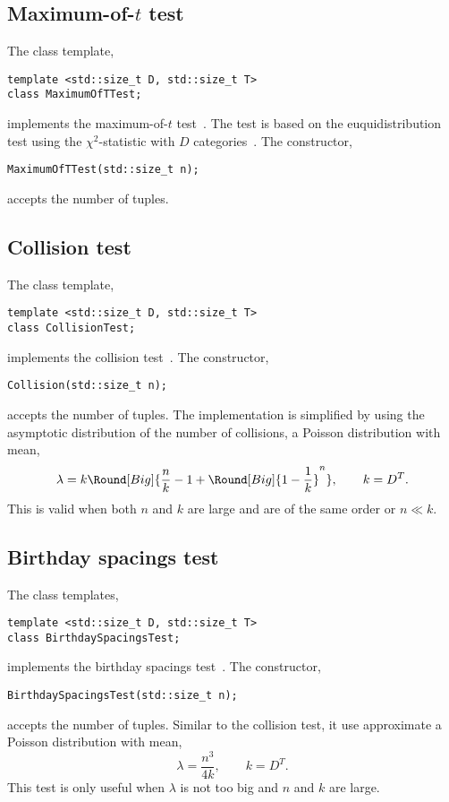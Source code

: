 \subsection{Maximum-of-\texorpdfstring{$t$}{t} test}
\label{Maximum-of-t test}

The class template,
\begin{Verbatim}
template <std::size_t D, std::size_t T>
class MaximumOfTTest;
\end{Verbatim}
implements the maximum-of-$t$ test~\cite[pp.~70]{Knuth:1997us}. The test is
based on the euquidistribution test using the $\chi^2$-statistic with $D$
categories~\cite[pp.~61]{Knuth:1997us}. The constructor,
\begin{Verbatim}
MaximumOfTTest(std::size_t n);
\end{Verbatim}
accepts the number of tuples.

\subsection{Collision test}
\label{Collision test}

The class template,
\begin{Verbatim}
template <std::size_t D, std::size_t T>
class CollisionTest;
\end{Verbatim}
implements the collision test~\cite[pp.~70]{Knuth:1997us}. The constructor,
\begin{Verbatim}
Collision(std::size_t n);
\end{Verbatim}
accepts the number of tuples. The implementation is simplified by using the
asymptotic distribution of the number of collisions, a Poisson distribution
with mean,
\begin{equation*}
  \lambda = k\Round[Big]{
    \frac{n}{k} - 1 + \Round[Big]{1 - \frac{1}{k}}^n},\qquad k = D^T.
\end{equation*}
This is valid when both $n$ and $k$ are large and are of the same order or
$n \ll k$.

\subsection{Birthday spacings test}
\label{sub:Birthday spacings test}

The class templates,
\begin{Verbatim}
template <std::size_t D, std::size_t T>
class BirthdaySpacingsTest;
\end{Verbatim}
implements the birthday spacings test~\cite[pp.~71]{Knuth:1997us}. The
constructor,
\begin{Verbatim}
BirthdaySpacingsTest(std::size_t n);
\end{Verbatim}
accepts the number of tuples. Similar to the collision test, it use approximate
a Poisson distribution with mean,
\begin{equation*}
  \lambda = \frac{n^3}{4k},\qquad k = D^T.
\end{equation*}
This test is only useful when $\lambda$ is not too big and $n$ and $k$ are
large.
